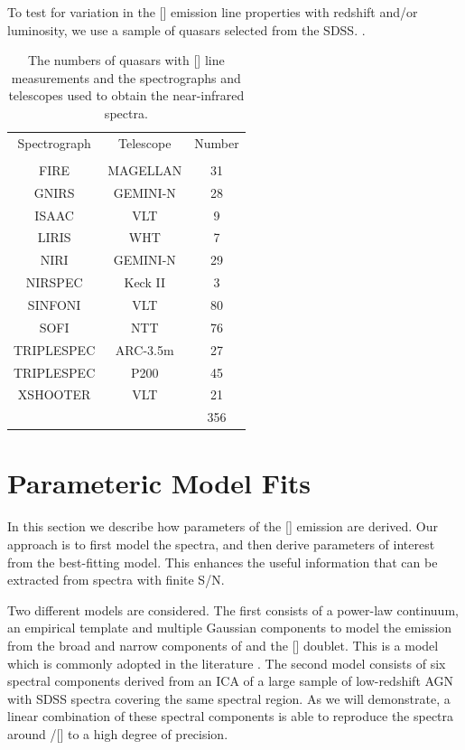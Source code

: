 To test for variation in the [] emission line properties with redshift and/or luminosity, we use a sample of quasars selected from the \ac{SDSS}. 
. 


\begin{table}
  \centering
  \small 
  \caption{The numbers of quasars with [] line measurements and the spectrographs and telescopes used to obtain the near-infrared spectra.}
  \label{tab:specnums_ch4}
    \begin{tabular}{ccc} 
    \hline
    Spectrograph & Telescope & Number \\
                 &           & \\
    \hline
    FIRE         & MAGELLAN  & 31 \\
    GNIRS        & GEMINI-N  & 28 \\
    ISAAC        & VLT       & 9 \\
    LIRIS        & WHT       & 7 \\
    NIRI         & GEMINI-N  & 29 \\
    NIRSPEC      & Keck II   & 3 \\
    SINFONI      & VLT       & 80 \\
    SOFI         & NTT       & 76 \\
    TRIPLESPEC   & ARC-3.5m  & 27 \\
    TRIPLESPEC   & P200      & 45 \\
    XSHOOTER     & VLT       & 21 \\
    \hline
    & & 356 \\
    \hline
    \end{tabular}
\end{table} 

\section{Parameteric Model Fits}

In this section we describe how parameters of the [] emission are derived. 
Our approach is to first model the spectra, and then derive parameters of interest from the best-fitting model. 
This enhances the useful information that can be extracted from spectra with finite \ac{S/N}. 

Two different models are considered.
The first consists of a power-law continuum, an empirical  template and multiple Gaussian components to model the emission from the broad and narrow components of \hb and the [] doublet. 
This is a model which is commonly adopted in the literature \citep[e.g.][]{shen11}. 
The second model consists of six spectral components derived from an \ac{ICA} of a large sample of low-redshift \ac{AGN} with SDSS spectra covering the same spectral region.
As we will demonstrate, a linear combination of these spectral components is able to reproduce the spectra around \hbns/[] to a high degree of precision.  

